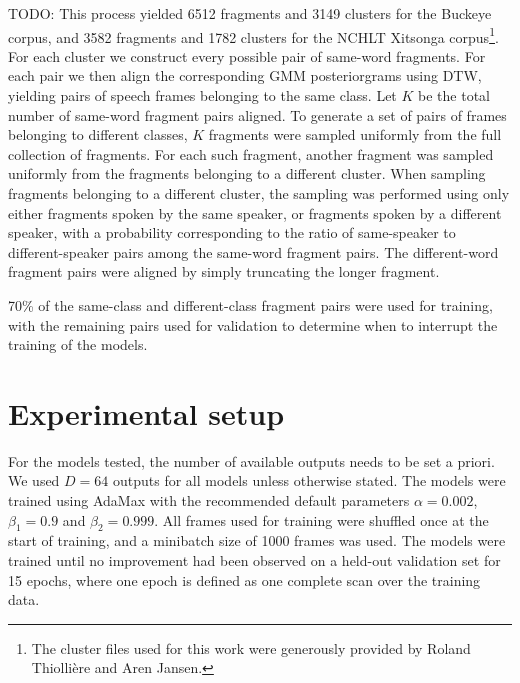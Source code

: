 TODO: This process yielded 6512 fragments and 3149 clusters for the Buckeye corpus, and 3582 fragments and 1782 clusters for the NCHLT Xitsonga corpus\footnote{The cluster files used for this work were generously provided by Roland Thiollière and Aren Jansen.}.
For each cluster we construct every possible pair of same-word fragments.
For each pair we then align the corresponding GMM posteriorgrams using DTW, yielding pairs of speech frames belonging to the same class.
Let $K$ be the total number of same-word fragment pairs aligned.
To generate a set of pairs of frames belonging to different classes, $K$ fragments were sampled uniformly from the full collection of fragments.
For each such fragment, another fragment was sampled uniformly from the fragments belonging to a different cluster.
When sampling fragments belonging to a different cluster, the sampling was performed using only either fragments spoken by the same speaker, or fragments spoken by a different speaker, with a probability corresponding to the ratio of same-speaker to different-speaker pairs among the same-word fragment pairs.
The different-word fragment pairs were aligned by simply truncating the longer fragment.

70\% of the same-class and different-class fragment pairs were used for training, with the remaining pairs used for validation to determine when to interrupt the training of the models.

\section{Experimental setup}
For the models tested, the number of available outputs needs to be set a priori.
We used $D = 64$ outputs for all models unless otherwise stated.
The models were trained using AdaMax \parencite{kingma2014adam} with the recommended default parameters $\alpha = 0.002$, $\beta_1 = 0.9$ and $\beta_2 = 0.999$.
All frames used for training were shuffled once at the start of training, and a minibatch size of 1000 frames was used.
The models were trained until no improvement had been observed on a held-out validation set for 15 epochs, where one epoch is defined as one complete scan over the training data.

